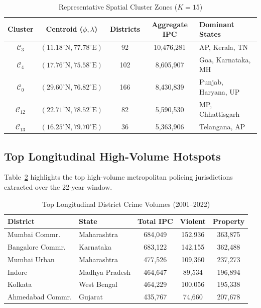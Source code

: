 \documentclass[conference]{IEEEtran}
\begin{document}
\begin{table}[h]
\centering
\caption{Representative Spatial Cluster Zones ($K=15$)}
\label{tab:clusters}
\begin{tabular}{ccccl}
\toprule
\textbf{Cluster} & \textbf{Centroid ($\phi, \lambda$)} & \textbf{Districts} & \textbf{Aggregate IPC} & \textbf{Dominant States} \\
\midrule
$\mathcal{C}_3$ & $(11.18^{\circ}\text{N}, 77.78^{\circ}\text{E})$ & 92 & 10,476,281 & AP, Kerala, TN \\
$\mathcal{C}_4$ & $(17.76^{\circ}\text{N}, 75.58^{\circ}\text{E})$ & 102 & 8,605,907 & Goa, Karnataka, MH \\
$\mathcal{C}_0$ & $(29.60^{\circ}\text{N}, 76.82^{\circ}\text{E})$ & 166 & 8,430,839 & Punjab, Haryana, UP \\
$\mathcal{C}_{12}$ & $(22.71^{\circ}\text{N}, 78.52^{\circ}\text{E})$ & 82 & 5,590,530 & MP, Chhattisgarh \\
$\mathcal{C}_{13}$ & $(16.25^{\circ}\text{N}, 79.70^{\circ}\text{E})$ & 36 & 5,363,906 & Telangana, AP \\
\bottomrule
\end{tabular}
\end{table}

\subsection{Top Longitudinal High-Volume Hotspots}
Table~\ref{tab:hotspots} highlights the top high-volume metropolitan policing jurisdictions extracted over the 22-year window.

\begin{table}[h]
\centering
\caption{Top Longitudinal District Crime Volumes (2001--2022)}
\label{tab:hotspots}
\begin{tabular}{llccc}
\toprule
\textbf{District} & \textbf{State} & \textbf{Total IPC} & \textbf{Violent} & \textbf{Property} \\
\midrule
Mumbai Commr. & Maharashtra & 684,049 & 152,936 & 363,875 \\
Bangalore Commr. & Karnataka & 683,122 & 142,155 & 362,488 \\
Mumbai Urban & Maharashtra & 477,526 & 109,360 & 237,273 \\
Indore & Madhya Pradesh & 464,647 & 89,534 & 196,894 \\
Kolkata & West Bengal & 464,229 & 100,056 & 195,338 \\
Ahmedabad Commr. & Gujarat & 435,767 & 74,660 & 207,678 \\
\bottomrule
\end{tabular}
\end{table}
\end{document}
